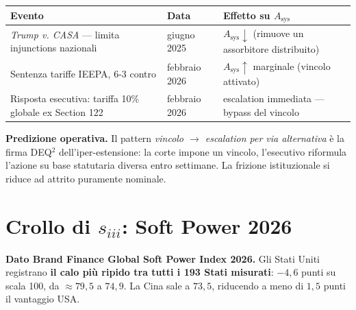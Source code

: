 {\def\LTcaptype{none} %
{\small\begin{longtable}[]{@{}
  >{\raggedright\arraybackslash}p{}
  >{\raggedright\arraybackslash}p{}
  >{\raggedright\arraybackslash}p{}@{}}
\toprule\noalign{}
\begin{minipage}[b]{\linewidth}\raggedright
Evento
\end{minipage} & \begin{minipage}[b]{\linewidth}\raggedright
Data
\end{minipage} & \begin{minipage}[b]{\linewidth}\raggedright
Effetto su \(A_{\text{sys}}\)
\end{minipage} \\
\midrule\noalign{}
\endhead
\bottomrule\noalign{}
\endlastfoot
\emph{Trump v. CASA} --- limita injunctions nazionali & 27 giugno 2025 &
\(A_{\text{sys}} \downarrow\) (rimuove un assorbitore distribuito) \\
Sentenza tariffe IEEPA, 6-3 contro & 20 febbraio 2026 &
\(A_{\text{sys}} \uparrow\) marginale (vincolo attivato) \\
Risposta esecutiva: tariffa 10\% globale ex Section 122 & febbraio 2026
& escalation immediata --- bypass del vincolo \\
\end{longtable}}
}

\Conj{} \textbf{Predizione operativa.} Il pattern \emph{vincolo \(\to\)
escalation per via alternativa} è la firma DEQ$^2$ dell'iper-estensione: la
corte impone un vincolo, l'esecutivo riformula l'azione su base
statutaria diversa entro settimane. La frizione istituzionale si riduce
ad attrito puramente nominale.



\section{\texorpdfstring{Crollo di \(s_{iii}\): Soft Power
2026}{Crollo di s\_\{iii\}: Soft Power 2026}}\label{crollo-di-s_iii-soft-power-2026}

\Proved{} \textbf{Dato Brand Finance Global Soft Power Index 2026.} Gli
Stati Uniti registrano \textbf{il calo più ripido tra tutti i 193 Stati
misurati}: \(-4{,}6\) punti su scala 100, da \(\approx 79{,}5\) a
\(74{,}9\). La Cina sale a \(73{,}5\), riducendo a meno di \(1{,}5\)
punti il vantaggio USA.

